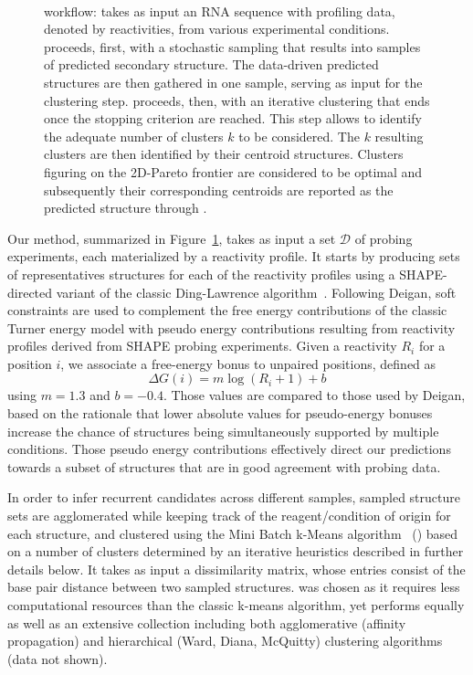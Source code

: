 \documentclass[a4,center,fleqn]{NAR}
\begin{document}
\begin{figure}
	{\centering\resizebox{.9\columnwidth}{!}{
			
		}\\}
	
	\caption{\OurTool{} workflow: \OurTool{} takes as input an RNA sequence with profiling data, denoted by reactivities, from various experimental conditions. \OurTool{} proceeds, first,  with a stochastic sampling that results into samples of predicted secondary structure. The data-driven predicted structures are then gathered in one sample, serving as input for the clustering step. \OurTool{} proceeds, then, with an iterative clustering that ends once the stopping criterion are reached. This step allows to identify the adequate number of clusters $k$ to be considered. The $k$ resulting clusters are then identified by their centroid structures. Clusters figuring on the 2D-Pareto frontier are considered to be optimal and subsequently their corresponding centroids are reported as the predicted structure through \OurTool.}\label{fig:approach}
\end{figure}


Our method, summarized in Figure~\ref{fig:approach}, takes as input a set $\mathcal{D}$ of probing experiments, each materialized by a reactivity profile. It starts by producing sets of representatives structures for each of the reactivity profiles using a SHAPE-directed variant of the classic Ding-Lawrence algorithm~\citep{Ding2003}. Following Deigan\etal\cite{Deigan2009}, soft constraints are used to complement the free energy contributions of the classic Turner energy model with pseudo energy contributions resulting from reactivity profiles derived from SHAPE probing experiments.  Given a reactivity $R_i$ for a position $i$, we associate a free-energy bonus to unpaired positions, defined as
$$\Delta G(i) = m \log(R_i +1 )+b$$ 
using $m=1.3$ and  $b=-0.4$. Those values are compared to those used by Deigan\etal\cite{Deigan2009}, based on the rationale that lower absolute values for pseudo-energy bonuses increase the chance of structures being simultaneously supported by multiple conditions. Those pseudo energy contributions effectively direct our predictions towards a subset of structures that are in good agreement with probing data. 

In order to infer recurrent candidates across different samples, sampled structure sets are agglomerated while keeping track of the reagent/condition of origin for each structure, and clustered using the Mini Batch k-Means algorithm~\citep{Sculley2010} (\CL{}) based on a number of clusters determined by an iterative heuristics described in further details below. 
It takes as input a dissimilarity matrix, whose entries consist of the base pair distance between two sampled structures.
\CL{} was chosen as it requires less computational resources than the classic k-means algorithm, yet performs equally as well as an extensive collection including  both agglomerative (affinity propagation) and hierarchical (Ward, Diana, McQuitty) clustering algorithms (data not shown). 
\end{document}
